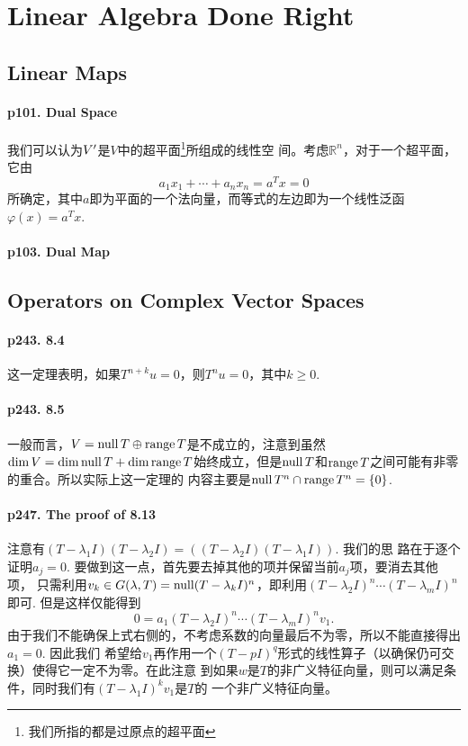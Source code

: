 \section{Linear Algebra Done Right}

\setcounter{subsection}{2}
\subsection{Linear Maps}
  \paragraph{p101. Dual Space}
    我们可以认为$V^\prime$是$V$中的超平面\footnote{我们所指的都是过原点的超平面}所组成的线性空
    间。考虑$\mathbb{R}^n$，对于一个超平面，它由
    \[
      a_1x_1+\cdots+a_nx_n = a^Tx = 0      
    \]
    所确定，其中$a$即为平面的一个法向量，而等式的左边即为一个线性泛函$\varphi(x)=a^Tx$. 

  \paragraph{p103. Dual Map}
    

\setcounter{subsection}{7}
\subsection{Operators on Complex Vector Spaces}
  \paragraph{p243. 8.4}
    这一定理表明，如果$T^{n+k}u=0$，则$T^nu=0$，其中$k\ge 0$.

  \paragraph{p243. 8.5}
    一般而言，$V=\operatorname{null} T\oplus\operatorname{range} T$是不成立的，注意到虽然$\dim V=\dim\operatorname{null} T+\dim
    \operatorname{range} T$始终成立，但是$\operatorname{null} T$和$\operatorname{range} T$之间可能有非零的重合。所以实际上这一定理的
    内容主要是$\operatorname{null} T^n\cap \operatorname{range} T^n = \{0\}$.

  \paragraph{p247. The proof of 8.13}
    注意有$(T-\lambda_1I)(T-\lambda_2I)=((T-\lambda_2I)(T-\lambda_1I))$. 我们的思
    路在于逐个证明$a_j=0$. 要做到这一点，首先要去掉其他的项并保留当前$a_j$项，要消去其他项，
    只需利用$v_k\in G(\lambda, T)=\operatorname{null}(T-\lambda_kI)^n$，即利用$(T-\lambda_2I)^n
    \cdots(T-\lambda_mI)^n$即可. 但是这样仅能得到
    \[
      0 = a_1(T-\lambda_2I)^n\cdots(T-\lambda_mI)^nv_1.
    \]
    由于我们不能确保上式右侧的，不考虑系数的向量最后不为零，所以不能直接得出$a_1=0$. 因此我们
    希望给$v_1$再作用一个$(T-pI)^q$形式的线性算子（以确保仍可交换）使得它一定不为零。在此注意
    到如果$w$是$T$的非广义特征向量，则可以满足条件，同时我们有$(T-\lambda_1I)^kv_1$是$T$的
    一个非广义特征向量。


